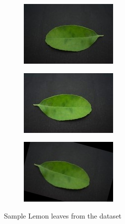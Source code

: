 \documentclass[twocolumn]{article}
\begin{document}
\begin{figure}[H]
    \begin{subfigure}[b]{0.30\columnwidth}
        \includegraphics[width=\textwidth]{lemon7}
    \end{subfigure}
    \hfill
    \begin{subfigure}[b]{0.30\columnwidth}
        \includegraphics[width=\textwidth]{lemon8}
    \end{subfigure}
    \hfill
    \begin{subfigure}[b]{0.30\columnwidth}
        \includegraphics[width=\textwidth]{lemon9}
    \end{subfigure}
    \caption{Sample Lemon leaves from the dataset}
    \label{fig:lemon-samples}
\end{figure}
\end{document}
